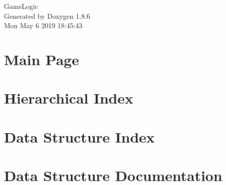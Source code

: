 \documentclass[twoside]{book}
\newcommand{\clearemptydoublepage}{%
  \newpage{\pagestyle{empty}\cleardoublepage}%
}
\begin{document}
\hypersetup{pageanchor=false}
\begin{titlepage}
\vspace*{7cm}
\begin{center}%
{\Large Game\-Logic }\\
\vspace*{1cm}
{\large Generated by Doxygen 1.8.6}\\
\vspace*{0.5cm}
{\small Mon May 6 2019 18:45:43}\\
\end{center}
\end{titlepage}
\clearemptydoublepage
\tableofcontents
\clearemptydoublepage
{}
\hypersetup{pageanchor=true}

\chapter{Main Page}
\label{index}\hypertarget{index}{}
\chapter{Hierarchical Index}

\chapter{Data Structure Index}

\chapter{Data Structure Documentation}




























\newpage
{}
{}
\printindex
\end{document}
